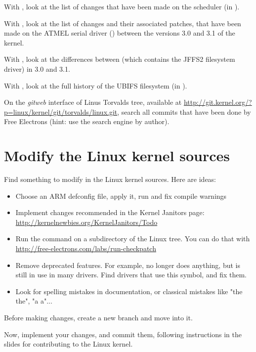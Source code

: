 With , look at the list of changes that have been made on the scheduler
(in ).

With , look at the list of changes and their associated
patches, that have been made on the ATMEL serial driver
() between the versions 3.0
and 3.1 of the kernel.

With , look at the differences between 
(which contains the JFFS2 filesystem driver) in 3.0 and 3.1.

With , look at the full history of the UBIFS filesystem (in
).

On the {\em gitweb} interface of Linus Torvalds tree, available at
\url{http://git.kernel.org/?p=linux/kernel/git/torvalds/linux.git},
search all commits that have been done by Free Electrons (hint: use
the search engine by author).

\section{Modify the Linux kernel sources}

Find something to modify in the Linux kernel sources. Here are ideas:

\begin{itemize}
\item Choose an ARM defconfig file, apply it, run  and fix compile warnings
\item Implement changes recommended in the Kernel Janitors page: \url{http://kernelnewbies.org/KernelJanitors/Todo}
\item Run the  command on a subdirectory of the Linux tree.
      You can do that with \url{http://free-electrons.com/labs/run-checkpatch}
\item Remove deprecated features. For example,  no longer does anything,
      but is still in use in many drivers. Find drivers that use this symbol, and fix them.
\item Look for spelling mistakes in documentation, or classical mistakes like "the the", "a a"...
\end{itemize}

Before making changes, create a new branch and move into it.

Now, implement your changes, and commit them, following instructions 
in the slides for contributing to the Linux kernel.


